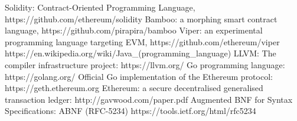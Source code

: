 \documentclass{article}
\begin{document}
\newpage
\begin{thebibliography}{9}
  Solidity: Contract-Oriented Programming Language, https://github.com/ethereum/solidity
  Bamboo: a morphing smart contract language, https://github.com/pirapira/bamboo
  Viper: an experimental programming language targeting EVM, https://github.com/ethereum/viper
  https://en.wikipedia.org/wiki/Java\_(programming\_language)
  LLVM: The compiler infrastructure project: https://llvm.org/
  Go programming language: https://golang.org/
  Official Go implementation of the Ethereum protocol: https://geth.ethereum.org
  Ethereum: a secure decentralised generalised transaction ledger: http://gavwood.com/paper.pdf
  Augmented BNF for Syntax Specifications: ABNF (RFC-5234) https://tools.ietf.org/html/rfc5234

\end{thebibliography}
\end{document}
